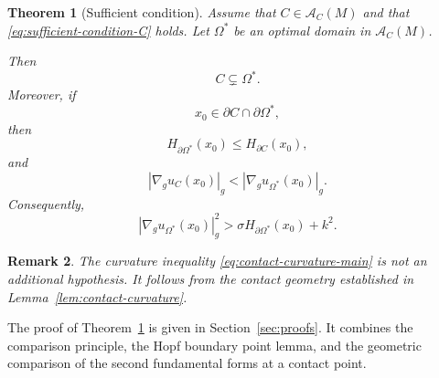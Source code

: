 \documentclass{article}
\renewcommand{\boxed}[1]{#1}
\newtheorem{theorem}{Theorem}[section]
\newtheorem{remark}[theorem]{Remark}
\begin{document}
\begin{theorem}[Sufficient condition]
\label{thm:sufficient-condition}
Assume that $C\in\mathcal A_C(M)$ and that
\eqref{eq:sufficient-condition-C} holds. Let $\Omega^\ast$ be an
optimal domain in $\mathcal A_C(M)$.

Then
\[
C\subsetneq\Omega^\ast.
\]
Moreover, if
\[
x_0\in
\partial C\cap\partial\Omega^\ast,
\]
then
\begin{equation}
H_{\partial\Omega^\ast}(x_0)
\leq
H_{\partial C}(x_0),
\label{eq:contact-curvature-main}
\end{equation}
and
\begin{equation}
|\nabla_g u_C(x_0)|_g
<
|\nabla_g u_{\Omega^\ast}(x_0)|_g.
\label{eq:contact-gradient-main}
\end{equation}
Consequently,
\begin{equation}
|\nabla_g u_{\Omega^\ast}(x_0)|_g^2
>
\sigma H_{\partial\Omega^\ast}(x_0)+k^2.
\label{eq:strict-free-boundary-inequality-contact}
\end{equation}
\end{theorem}

\begin{remark}
The curvature inequality
\eqref{eq:contact-curvature-main} is not an additional hypothesis.
It follows from the contact geometry established in
Lemma~\ref{lem:contact-curvature}.
\end{remark}

The proof of Theorem~\ref{thm:sufficient-condition} is given in
Section~\ref{sec:proofs}. It combines the comparison principle, the
Hopf boundary point lemma, and the geometric comparison of the second
fundamental forms at a contact point.

\end{document}
